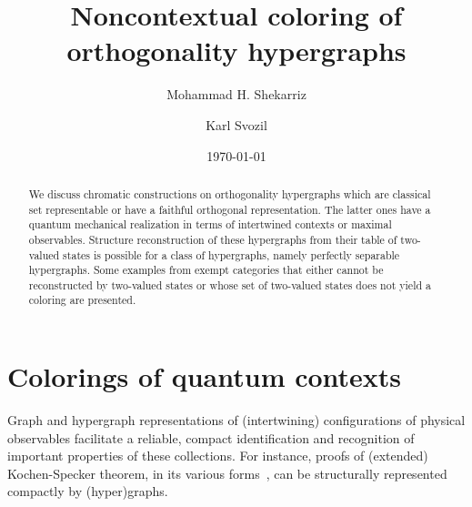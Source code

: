 \documentclass[%
12pt,
prereprint,
showpacs,
showkeys,
preprintnumbers,
amsmath,amssymb,
aps,
pra,
longbibliography,
notitlepage
]{revtex4-1}
\theoremstyle{definition}
\begin{document}
        \title{Noncontextual coloring of orthogonality hypergraphs}



        \author{Mohammad H. Shekarriz}

        \author{Karl Svozil}



        \date{\today}

        \begin{abstract}
                We discuss chromatic constructions on orthogonality hypergraphs which are classical set representable or have a faithful orthogonal representation. The latter ones have a quantum mechanical realization in terms of intertwined contexts or maximal observables. Structure reconstruction of these hypergraphs from their table of two-valued states is possible for a class of hypergraphs, namely perfectly separable hypergraphs. Some examples from exempt categories that either cannot be reconstructed by two-valued states or whose set of two-valued states does not yield a coloring are presented.
        \end{abstract}


        \maketitle


        \section{Colorings of quantum contexts}

        Graph and hypergraph representations of (intertwining) configurations of physical observables facilitate a reliable,
        compact identification and recognition of important properties of these collections.
        For instance, proofs of (extended) Kochen-Specker theorem, in its various forms~\cite{kochen1,cabello-96,hru-pit-2003,2015-AnalyticKS},
        can be structurally represented compactly by (hyper)graphs.
\end{document}
